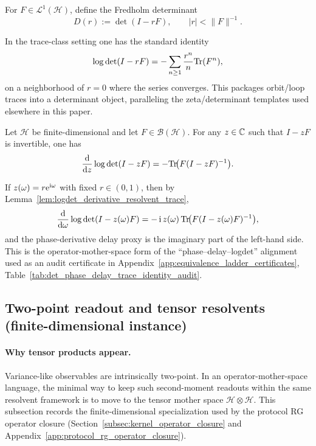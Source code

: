 \begin{definition}\label{def:fredholm_det_traceclass}
\MathTag For $F\in\mathcal{L}^1(\mathcal{H})$, define the Fredholm determinant
\[
D(r):=\det(I-rF),
\qquad |r|<\|F\|^{-1}.
\]
\end{definition}

\begin{remark}\label{rem:logdet_trace_expansion}
\MathTag In the trace-class setting one has the standard identity
\[
\log \det(I-rF)
=-\sum_{n\ge 1}\frac{r^n}{n}\mathrm{Tr}(F^n),
\]
on a neighborhood of $r=0$ where the series converges.
This packages orbit/loop traces into a determinant object, paralleling the zeta/determinant templates used elsewhere in this paper.
\end{remark}

\begin{lemma}\label{lem:logdet_derivative_resolvent_trace}
\MathTag Let $\mathcal{H}$ be finite-dimensional and let $F\in\mathcal{B}(\mathcal{H})$.
For any $z\in\mathbb{C}$ such that $I-zF$ is invertible, one has
\[
\frac{\mathrm{d}}{\mathrm{d} z}\log\det(I-zF)=-\mathrm{Tr}\!\bigl(F(I-zF)^{-1}\bigr).
\]
\end{lemma}

\begin{remark}\label{rem:det_phase_derivative_audit_reading}
\AuditTag If $z(\omega)=r\mathrm{e}^{\mathrm{i}\omega}$ with fixed $r\in(0,1)$, then by Lemma~\ref{lem:logdet_derivative_resolvent_trace},
\[
\frac{\mathrm{d}}{\mathrm{d}\omega}\log\det(I-z(\omega)F)
=-\,\mathrm{i}\,z(\omega)\,\mathrm{Tr}\!\bigl(F(I-z(\omega)F)^{-1}\bigr),
\]
and the phase-derivative delay proxy is the imaginary part of the left-hand side.
This is the operator-mother-space form of the ``phase--delay--logdet'' alignment used as an audit certificate in Appendix~\ref{app:equivalence_ladder_certificates},
Table~\ref{tab:det_phase_delay_trace_identity_audit}.
\end{remark}

\subsection{Two-point readout and tensor resolvents (finite-dimensional instance)}
\label{subsec:operator_mother_space_tensor_resolvent}

\paragraph{Why tensor products appear.}
\AuditTag Variance-like observables are intrinsically two-point.
In an operator-mother-space language, the minimal way to keep such second-moment readouts within the same resolvent framework is to move to the tensor mother space $\mathcal{H}\otimes\mathcal{H}$.
This subsection records the finite-dimensional specialization used by the protocol RG operator closure (Section~\ref{subsec:kernel_operator_closure} and Appendix~\ref{app:protocol_rg_operator_closure}).

